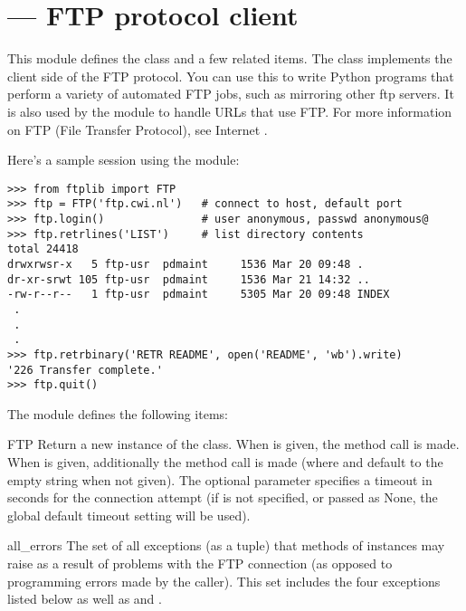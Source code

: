 \section{ ---
         FTP protocol client}



This module defines the class  and a few related items.
The  class implements the client side of the FTP
protocol.  You can use this to write Python
programs that perform a variety of automated FTP jobs, such as
mirroring other ftp servers.  It is also used by the module
 to handle URLs that use FTP.  For more information
on FTP (File Transfer Protocol), see Internet .

Here's a sample session using the  module:

\begin{verbatim}
>>> from ftplib import FTP
>>> ftp = FTP('ftp.cwi.nl')   # connect to host, default port
>>> ftp.login()               # user anonymous, passwd anonymous@
>>> ftp.retrlines('LIST')     # list directory contents
total 24418
drwxrwsr-x   5 ftp-usr  pdmaint     1536 Mar 20 09:48 .
dr-xr-srwt 105 ftp-usr  pdmaint     1536 Mar 21 14:32 ..
-rw-r--r--   1 ftp-usr  pdmaint     5305 Mar 20 09:48 INDEX
 .
 .
 .
>>> ftp.retrbinary('RETR README', open('README', 'wb').write)
'226 Transfer complete.'
>>> ftp.quit()
\end{verbatim}

The module defines the following items:

\begin{classdesc}{FTP}{}
Return a new instance of the  class.  When
 is given, the method call  is
made.  When  is given, additionally the method call
 is made (where
 and  default to the empty string when not given).
The optional  parameter specifies a timeout in seconds for the
connection attempt (if is not specified, or passed as None, the global
default timeout setting will be used).
\end{classdesc}

\begin{datadesc}{all_errors}
The set of all exceptions (as a tuple) that methods of 
instances may raise as a result of problems with the FTP connection
(as opposed to programming errors made by the caller).  This set
includes the four exceptions listed below as well as
 and .
\end{datadesc}

